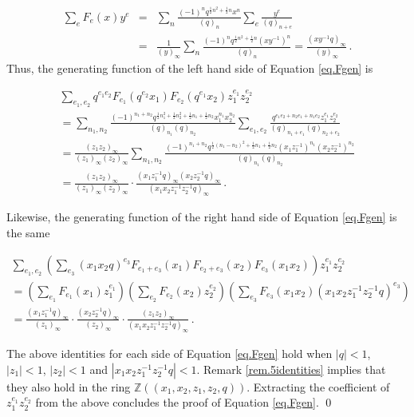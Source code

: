\documentclass[12pt]{amsart}
\theoremstyle{definition}
\def\BZ{\mathbb Z}
\numberwithin{equation}{section}
\begin{document}
\begin{eqnarray*}
\sum_e F_e(x)y^e &=&
\sum_n \frac{(-1)^n q^{\frac{1}{2}n^2+\frac{1}{2}n} x^n}{(q)_n}
\sum_e \frac{y^e}{(q)_{n+e}} \\
&=& \frac{1}{(y)_\infty} 
\sum_n \frac{(-1)^n q^{\frac{1}{2}n^2+\frac{1}{2}n} (xy^{-1})^n}{(q)_n}
= \frac{(x y^{-1}q)_\infty}{(y)_\infty} \,.
\end{eqnarray*}
Thus, the generating function of the left hand side of Equation 
\eqref{eq.Fgen} is

\begin{multline*}
\sum_{e_1,e_2} q^{e_1 e_2} F_{e_1}(q^{e_2} x_1)F_{e_2}(q^{e_1} x_2) z_1^{e_1}
z_2^{e_2}  \\
=\sum_{n_1,n_2} \frac{(-1)^{n_1+n_2}q^{\frac{1}{2}n_1^2+\frac{1}{2}n_2^2 
+ \frac{1}{2}n_1+ \frac{1}{2}n_2}x_1^{n_1} x_2^{n_2}}{(q)_{n_1}(q)_{n_2}}
\sum_{e_1,e_2} \frac{q^{e_1 e_2 + n_2 e_1 + n_1 e_2}z_1^{e_1}z_2^{e_2} 
 }{(q)_{n_1+e_1}(q)_{n_2+e_2}}
\\
=\frac{(z_1 z_2)_\infty}{(z_1)_\infty (z_2)_\infty}
\sum_{n_1,n_2} \frac{(-1)^{n_1+n_2}q^{\frac{1}{2}(n_1-n_2)^2
+ \frac{1}{2}n_1+ \frac{1}{2}n_2}(x_1 z_1^{-1})^{n_1} 
(x_2 z_2^{-1})^{n_2}}{(q)_{n_1}(q)_{n_2}}
\\
=\frac{(z_1z_2)_\infty}{(z_1)_\infty (z_2)_\infty} \cdot
\frac{(x_1z_1^{-1}q)_\infty (x_2z_2^{-1} q)_\infty}{
(x_1 x_2 z_1^{-1}z_2^{-1}q)_\infty} \,.
\end{multline*}

Likewise, 
the generating function of the right hand side of Equation 
\eqref{eq.Fgen} is the same

\begin{multline*}
\sum_{e_1,e_2} \left( \sum_{e_3} (x_1 x_2 q)^{e_3} F_{e_1+e_3}(x_1) F_{e_2+e_3}(x_2) 
F_{e_3}(x_1 x_2)\right) z_1^{e_1} z_2^{e_2} \\ 
=
\left(\sum_{e_1} F_{e_1}(x_1) z_1^{e_1}\right)
\left(\sum_{e_2} F_{e_2}(x_2) z_2^{e_2}\right)
\left(\sum_{e_3} F_{e_3}(x_1x_2) (x_1 x_2 z_1^{-1} z_2^{-1} q)^{e_3}\right)
\\
=\frac{(x_1z_1^{-1}q)_\infty}{(z_1)_\infty} \cdot
\frac{(x_2z_2^{-1}q)_\infty}{(z_2)_\infty} \cdot
\frac{(z_1z_2)_\infty}{(x_1 x_2 z_1^{-1}z_2^{-1}q)_\infty}\, .
\end{multline*}

The above identities for each side of Equation \eqref{eq.Fgen}
hold when $|q|<1$, $|z_1|<1$, $|z_2|<1$ and
$|x_1x_2z_1^{-1}z_2^{-1}q|<1$. Remark \ref{rem.5identities} implies that they also hold in the ring $\BZ((x_1,x_2,z_1,z_2,q))$. 
Extracting the coefficient of $z_1^{e_1} z_2^{e_2}$ from the above
concludes the proof of Equation \eqref{eq.Fgen}.
\qed
\end{document}
